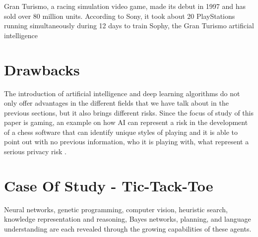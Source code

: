 \documentclass[conference]{IEEEtran}
\begin{document}
Gran Turismo, a racing simulation video game, made its debut in 1997 and has sold over 80 million units.
According to Sony, it took about 20 PlayStations running simultaneously during 12 days to train Sophy, the Gran Turismo artificial intelligence 


\section{Drawbacks}

The introduction of artificial intelligence and deep learning algorithms do not only offer advantages in the different fields that we have talk about in the previous sections, but it also brings different risks. Since the focus of study of this paper is gaming, an example on how AI can represent a risk in the development of a chess software that can identify unique styles of playing and it is able to point out with no previous information, who it is playing with, what represent a serious privacy risk \cite{unmask}.

\section{Case Of Study - Tic-Tack-Toe}



Neural networks, genetic programming, computer vision, heuristic search, knowledge representation and reasoning, Bayes networks, planning, and language understanding are each revealed through the growing capabilities of these agents.
\end{document}
